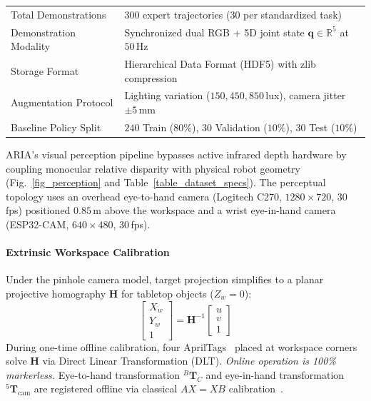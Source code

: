 \documentclass[journal]{IEEEtran}
\begin{document}
\begin{table}[!t]
{\begin{tabular}{ll}
Total Demonstrations & 300 expert trajectories ($30$ per standardized task) \\
Demonstration Modality & Synchronized dual RGB + 5D joint state $\mathbf{q} \in \mathbb{R}^5$ at $50$\,Hz \\
Storage Format & Hierarchical Data Format (HDF5) with zlib compression \\
Augmentation Protocol & Lighting variation ($150, 450, 850$\,lux), camera jitter $\pm 5$\,mm \\
Baseline Policy Split & $240$ Train ($80\%$), $30$ Validation ($10\%$), $30$ Test ($10\%$) \\
\bottomrule
\end{tabular}%
}
\end{table}

ARIA's visual perception pipeline bypasses active infrared depth hardware by coupling monocular relative disparity with physical robot geometry (Fig.~\ref{fig_perception} and Table~\ref{table_dataset_specs}). The perceptual topology uses an overhead eye-to-hand camera (Logitech C270, $1280\times720$, 30\,fps) positioned $0.85$\,m above the workspace and a wrist eye-in-hand camera (ESP32-CAM, $640\times480$, 30\,fps).

\paragraph{Extrinsic Workspace Calibration}
Under the pinhole camera model, target projection simplifies to a planar projective homography $\mathbf{H}$ for tabletop objects ($Z_w = 0$):
\begin{equation}
\begin{bmatrix} X_w \\ Y_w \\ 1 \end{bmatrix} = \mathbf{H}^{-1} \begin{bmatrix} u \\ v \\ 1 \end{bmatrix}
\end{equation}
During one-time offline calibration, four AprilTags~\cite{aria_036_olson_2011_apriltag} placed at workspace corners solve $\mathbf{H}$ via Direct Linear Transformation (DLT). \emph{Online operation is 100\% markerless.} Eye-to-hand transformation ${}^B\mathbf{T}_C$ and eye-in-hand transformation ${}^5\mathbf{T}_{\text{cam}}$ are registered offline via classical $AX=XB$ calibration~\cite{chaumette2006visual,aria_006_chanrungmaneekul_2025_arccalib}.
\end{document}
